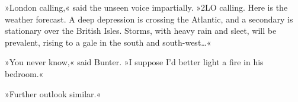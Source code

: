 »London calling,« said the unseen voice impartially. »2LO calling. Here is the weather forecast. A deep depression is crossing the Atlantic, and a secondary is stationary over the British Isles. Storms, with heavy rain and sleet, will be prevalent, rising to a gale in the south and south-west\dots«

»You never know,« said Bunter. »I suppose I'd better light a fire in his bedroom.«

»Further outlook similar.«
